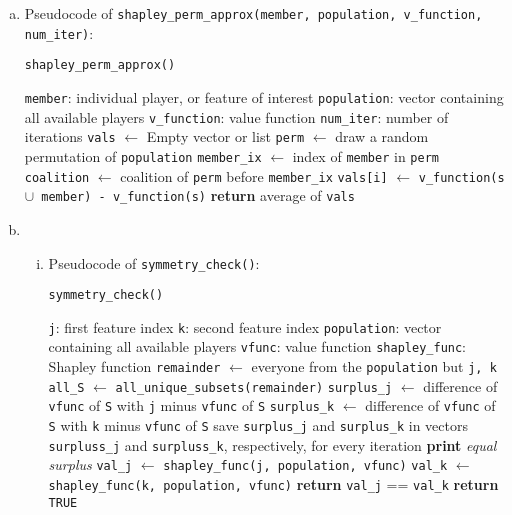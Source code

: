 {\begin{enumerate}[a)]
	\item
    Pseudocode of \texttt{shapley\_perm\_approx(member, population, v\_function, num\_iter)}:
	
	\begin{algorithm}[H]
		\caption{\texttt{shapley\_perm\_approx()}}
		\begin{algorithmic}[1]
			\Require \texttt{member}: individual player, or feature of interest
			\Require \texttt{population}: vector containing all available players
			\Require \texttt{v\_function}: value function
			\Require \texttt{num\_iter}: number of iterations
            \State \texttt{vals} $\gets$ Empty vector or list
			\State \texttt{perm} $\gets$ draw a random permutation of \texttt{population}
			\State \texttt{member\_ix} $\gets$ index of \texttt{member} in \texttt{perm}
			\State \texttt{coalition} $\gets$ coalition of \texttt{perm} before \texttt{member\_ix}
			\State \texttt{vals[i]} $\gets$ \texttt{v\_function(s $\cup$ member) - v\_function(s)}
			\EndFor
			\State \textbf{return} average of \texttt{vals}
		\end{algorithmic}
	\end{algorithm}
	
	\item 
	\begin{enumerate}[(i)]
	\item Pseudocode of \texttt{symmetry\_check()}:
	
	\begin{algorithm}[H]
		\caption{\texttt{symmetry\_check()}}
		\begin{algorithmic}[1]
			\Require \texttt{j}: first feature index
			\Require \texttt{k}: second feature index
			\Require \texttt{population}: vector containing all available players
			\Require \texttt{vfunc}: value function
			\Require \texttt{shapley\_func}: Shapley function
			\State \texttt{remainder} $\gets$ everyone from the \texttt{population} but \texttt{j, k}
			\State \texttt{all\_S} $\gets$ \texttt{all\_unique\_subsets(remainder)}
			\State \texttt{surplus\_j} $\gets$ difference of \texttt{vfunc} of \texttt{S} with \texttt{j} minus \texttt{vfunc} of \texttt{S}
			\State \texttt{surplus\_k} $\gets$ difference of \texttt{vfunc} of \texttt{S} with \texttt{k} minus \texttt{vfunc} of \texttt{S}
			\State save \texttt{surplus\_j} and \texttt{surplus\_k} in vectors \texttt{surpluss\_j} and \texttt{surpluss\_k}, respectively, for every iteration
			\EndFor
			\State \textbf{print} \textit{equal surplus}
			\State \texttt{val\_j} $\gets$ \texttt{shapley\_func(j, population, vfunc)}
			\State \texttt{val\_k} $\gets$ \texttt{shapley\_func(k, population, vfunc)}
			\State \textbf{return} \texttt{val\_j} == \texttt{val\_k}
			\EndIf
			\State \textbf{return} \texttt{TRUE}
		\end{algorithmic}
	\end{algorithm}
	

\end{enumerate}
\end{enumerate}}
